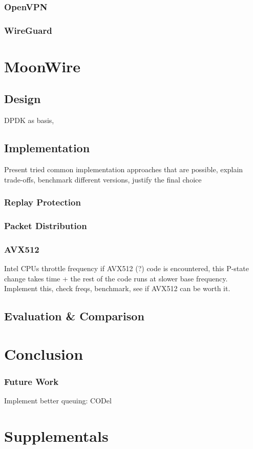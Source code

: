 \documentclass[IN,11pt,twoside,openright,master,english]{tumthesis}
\begin{document}
	\subsection{OpenVPN}
	\subsection{WireGuard}

\chapter{MoonWire}
\section{Design}
	DPDK as basis, 
\section{Implementation}
	Present tried common implementation approaches that are possible, explain trade-offs, benchmark different versions, justify the final choice
	\subsection{Replay Protection}
	\subsection{Packet Distribution}
	\subsection{AVX512}
		Intel CPUs throttle frequency if AVX512 (?) code is encountered, this P-state change takes time + the rest of the code runs at slower base frequency.
		Implement this, check freqs, benchmark, see if AVX512 can be worth it.
\section{Evaluation \& Comparison}


\chapter{Conclusion}
\subsection{Future Work}
	Implement better queuing: CODel

%


\appendix
\chapter{Supplementals}


\printacronyms[heading=chapter,name=List of acronyms]
\clearpage
\pagestyle{thesischapter}

\cleardoublepage
\printbibliography[heading=bibintoc]

\clearpage
\pagestyle{empty}
\end{document}
